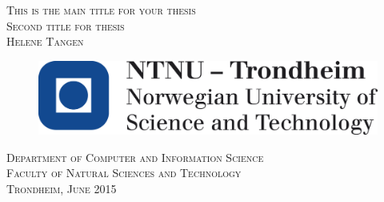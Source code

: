 \begin{titlepage}
\doublespacing
 \vspace*{\fill}
    \begin{center}
      {\Huge \scshape \Large This is the main title for your thesis\\ \normalsize Second title for thesis}\\[0.5cm]
      {      \scshape Helene Tangen }
     \end{center}
	\vspace*{3cm}
    \begin{figure}[H]
    \centering
    \includegraphics[scale=0.3]{logo_ntnu_eng}
    \end{figure}
    \begin{center}
    \scshape Department of Computer and Information Science \\
    \scshape Faculty of Natural Sciences and Technology\\
  	\normalfont Trondheim, June 2015
    \end{center}
   \vspace*{\fill}

\end{titlepage}
